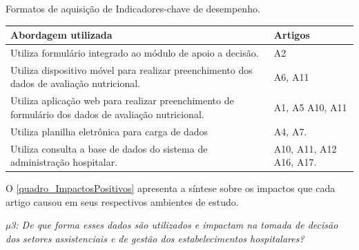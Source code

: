 \begin{quadro}[htb]
\caption{\label{quadro_indicadoresArtigos}Formatos de aquisição de Indicadores-chave de desempenho.}
\label{}
\begin{tabular}{|p{11cm}|p{4cm}|}
	\hline
	\textbf{Abordagem utilizada}   &   \textbf{Artigos}\\ \hline
	Utiliza formulário integrado ao módulo de apoio a decisão. &  A2\\ \hline
	Utiliza dispositivo móvel para realizar preenchimento dos dados de avaliação nutricional. & A6, A11\\ \hline
	Utiliza aplicação web para realizar preenchimento de formulário dos dados de avaliação nutricional. & A1, A5 A10, A11\\ \hline
	Utiliza planilha eletrônica para carga de dados & A4, A7.\\ \hline
	Utiliza consulta a base de dados do sistema de administração hospitalar. & A10, A11, A12 A16, A17.\\ \hline
\end{tabular}
\end{quadro}

O \autoref{quadro_ImpactosPositivos} apresenta a síntese sobre os impactos que cada artigo causou em seus respectivos ambientes de estudo. 
\newline

\textit{µ3: De que forma esses dados são utilizados e impactam na tomada de decisão dos setores assistenciais e de gestão dos estabelecimentos hospitalares?}

